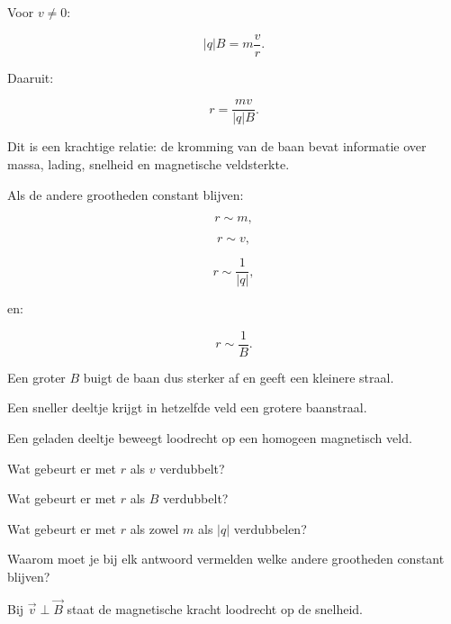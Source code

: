 \documentclass{ximera}
\begin{document}
Voor $v\neq0$:

\[
|q|B
=
m\frac vr.
\]

Daaruit:

\[
\boxed{
r=\frac{mv}{|q|B}.
}
\]

Dit is een krachtige relatie: de kromming van de baan bevat informatie
over massa, lading, snelheid en magnetische veldsterkte.



Als de andere grootheden constant blijven:

\[
r\sim m,
\]

\[
r\sim v,
\]

\[
r\sim\frac1{|q|},
\]

en:

\[
r\sim\frac1B.
\]

Een groter $B$ buigt de baan dus sterker af en geeft een kleinere
straal.

Een sneller deeltje krijgt in hetzelfde veld een grotere baanstraal.


\begin{oefening}{\oefU}

Een geladen deeltje beweegt loodrecht op een homogeen magnetisch veld.

\begin{question}
Wat gebeurt er met $r$ als $v$ verdubbelt?
\end{question}

\begin{question}
Wat gebeurt er met $r$ als $B$ verdubbelt?
\end{question}

\begin{question}
Wat gebeurt er met $r$ als zowel $m$ als $|q|$ verdubbelen?
\end{question}

\begin{question}
Waarom moet je bij elk antwoord vermelden welke andere grootheden
constant blijven?
\end{question}

\end{oefening}




Bij $\vec v\perp\vec B$ staat de magnetische kracht loodrecht op de
snelheid.
\end{document}
